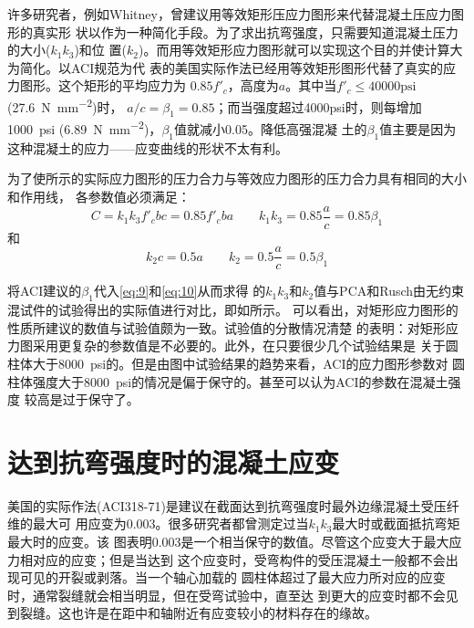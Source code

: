 \documentclass[12pt,a4paper]{book}
\begin{document}
许多研究者，例如Whitney，曾建议用等效矩形压应力图形来代替混凝土压应力图形的真实形
状以作为一种简化手段。为了求出抗弯强度，只需要知道混凝土压力的大小($k_1k_3$)和位
置($k_2$)。而用等效矩形应力图形就可以实现这个目的并使计算大为简化。以ACI规范为代
表的美国实际作法已经用等效矩形图形代替了真实的应力图形。这个矩形的平均应力为
$0.85f'_c$，高度为$a$。其中当$f'_c\le
40000\mathrm{psi}$(\SI{27.6}{\newton\per\square\milli\meter})时，
$a/c=\beta_1=0.85$；而当强度超过4000psi时，则每增加\SI{1000}{psi}
(\SI{6.89}{\newton\per\square\milli\meter})，$\beta_1$值就减小0.05。降低高强混凝
土的$\beta_1$值主要是因为这种混凝土的应力——应变曲线的形状不太有利。

为了使所示的实际应力图形的压力合力与等效应力图形的压力合力具有相同的大小和作用线，
各参数值必须满足：
\begin{equation}
  \label{eq:9}
  C=k_1k_3f'_cbc=0.85f'_cba \qquad k_1k_3=0.85\frac{a}{c}=0.85\beta_1
\end{equation}
和
\begin{equation}
  \label{eq:10}
  k_2c=0.5a \qquad k_2=0.5\frac{a}{c}=0.5\beta_1
\end{equation}

将ACI建议的$\beta_1$代入\cref{eq:9}和\cref{eq:10}从而求得
的$k_1k_3$和$k_2$值与PCA和Rusch由无约束混试件的试验得出的实际值进行对比，即如所示。
可以看出，对矩形应力图形的性质所建议的数值与试验值颇为一致。试验值的分散情况清楚
的表明：对矩形应力图采用更复杂的参数值是不必要的。此外，在只要很少几个试验结果是
关于圆柱体大于\SI{8000}{psi}的。但是由图中试验结果的趋势来看，ACI的应力图形参数对
圆柱体强度大于\SI{8000}{psi}的情况是偏于保守的。甚至可以认为ACI的参数在混凝土强度
较高是过于保守了。

\section{达到抗弯强度时的混凝土应变}

美国的实际作法(ACI318-71)是建议在截面达到抗弯强度时最外边缘混凝土受压纤维的最大可
用应变为0.003。很多研究者都曾测定过当$k_1k_3$最大时或截面抵抗弯矩最大时的应变。该
图表明0.003是一个相当保守的数值。尽管这个应变大于最大应力相对应的应变；但是当达到
这个应变时，受弯构件的受压混凝土一般都不会出现可见的开裂或剥落。当一个轴心加载的
圆柱体超过了最大应力所对应的应变时，通常裂缝就会相当明显，但在受弯试验中，直至达
到更大的应变时都不会见到裂缝。这也许是在距中和轴附近有应变较小的材料存在的缘故。
\end{document}
